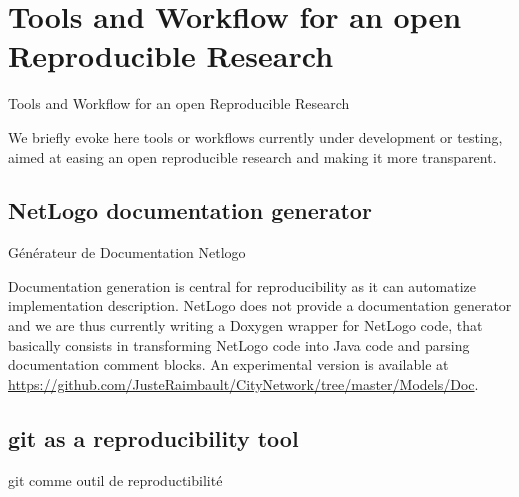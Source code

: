 



\chapter{Tools and Workflow for an open Reproducible Research}{Tools and Workflow for an open Reproducible Research} %

\label{app:workflow} %





%
%
%





\bigskip

We briefly evoke here tools or workflows currently under development or testing, aimed at easing an open reproducible research and making it more transparent.


\section{NetLogo documentation generator}{Générateur de Documentation Netlogo}

Documentation generation is central for reproducibility as it can automatize implementation description. NetLogo does not provide a documentation generator and we are thus currently writing a Doxygen wrapper for NetLogo code, that basically consists in transforming NetLogo code into Java code and parsing documentation comment blocks. An experimental version is available at \url{https://github.com/JusteRaimbault/CityNetwork/tree/master/Models/Doc}.



\section{git as a reproducibility tool}{git comme outil de reproductibilité}

